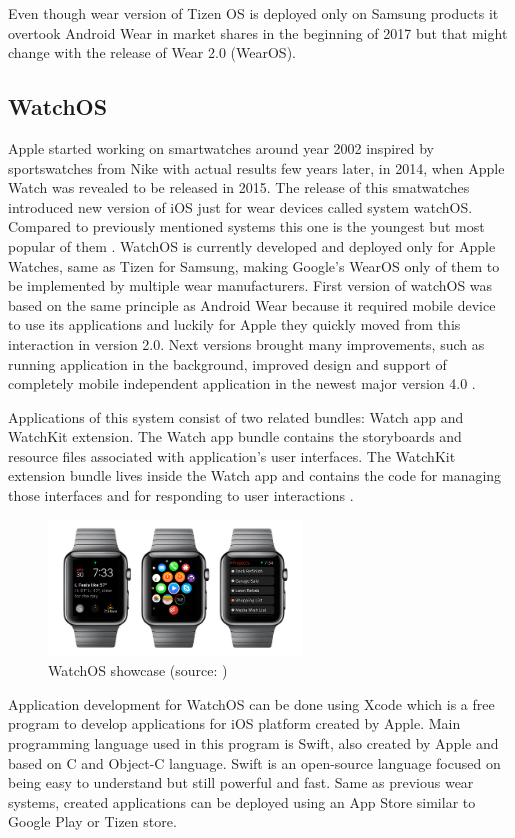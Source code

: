 Even though wear version of Tizen OS is deployed only on Samsung products it overtook Android Wear in market shares in the beginning of 2017 but that might change with the release of Wear 2.0 (WearOS). 

\subsection{WatchOS}\label{sec:WatchOS}
Apple started working on smartwatches around year 2002 inspired by sportswatches from Nike with actual results few years later, in 2014, when Apple Watch was revealed to be released in 2015. The release of this smatwatches introduced new version of iOS just for wear devices called system watchOS. Compared to previously mentioned systems this one is the youngest but most popular of them \cite{ATOHAWWC}. WatchOS is currently developed and deployed only for Apple Watches, same as Tizen for Samsung, making Google's WearOS only of them to be implemented by multiple wear manufacturers. First version of watchOS was based on the same principle as Android Wear because it required mobile device to use its applications and luckily for Apple they quickly moved from this interaction in version 2.0. Next versions brought many improvements, such as running application in the background, improved design and support of completely mobile independent application in the newest major version 4.0 \cite{WOS9To5MAC}.

Applications of this system consist of two related bundles: Watch app and WatchKit extension. The Watch app bundle contains the storyboards and resource files associated with application's user interfaces. The WatchKit extension bundle lives inside the Watch app and contains the code for managing those interfaces and for responding to user interactions \cite{AppleDev}.

\begin{figure}[H]
	\begin{centering}
		\includegraphics[width=0.6\textwidth]{img/apple_watchOs}
		\par\end{centering}
	\caption{WatchOS showcase (source: \cite{HTFAIAAW})\label{fig:WatchOS}}
	\label{fig06c04}
\end{figure}

Application development for WatchOS can be done using Xcode which is a free program to develop applications for iOS platform created by Apple. Main programming language used in this program is Swift, also created by Apple and based on C and Object-C language. Swift is an open-source language focused on being easy to understand but still powerful and fast. Same as previous wear systems, created applications can be deployed using an App Store similar to Google Play or Tizen store.
